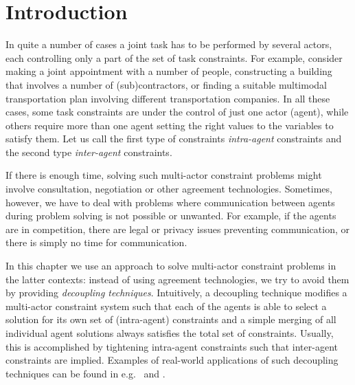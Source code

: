 
\section{Introduction}
In quite a number of cases a joint task has to be performed by several actors, each controlling only a part of the set of task constraints. 
For example, consider making a joint appointment with a number of people, constructing a building that involves a number of (sub)contractors, 
or finding a suitable multimodal transportation plan involving different transportation companies. 
In all these cases, some task constraints are under the control of just one actor (agent), 
while others require more than one agent setting the right values to the variables to satisfy them. 
Let us call the first type of constraints \emph{intra-agent} constraints and the second type  \emph{inter-agent} constraints.

If there is enough time, solving such multi-actor constraint problems might involve consultation, negotiation or other agreement technologies.
Sometimes, however, we have to deal with problems where communication between agents during problem solving is not possible
or unwanted. For example, if the agents are in competition, there are legal or privacy issues preventing communication, or there is simply no time for
communication. 

In this chapter we use an approach to solve multi-actor constraint problems in the latter contexts: 
instead of using agreement technologies, we try to avoid them by providing {\em decoupling techniques}. 
Intuitively, a decoupling technique modifies a multi-actor constraint system such that 
each of the agents is able to select a solution for its own set of (intra-agent) constraints 
and a simple merging of all individual agent solutions always satisfies the total set of constraints. 
Usually, this is accomplished by tightening intra-agent constraints such that inter-agent constraints are implied. Examples of real-world applications of such decoupling techniques can be found in e.g.\  \cite{brambilla:2010} and \cite{leeuwen:2009}.

